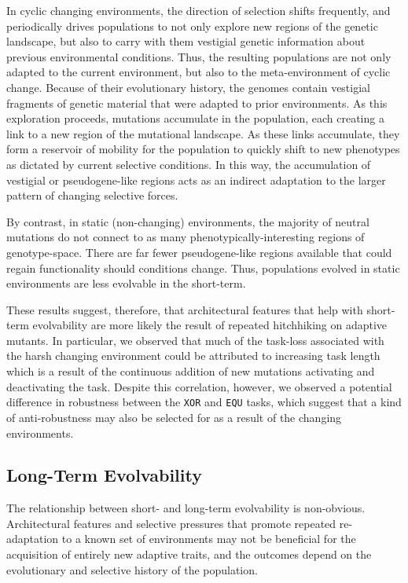 \documentclass[10pt,letterpaper,final]{article}
\begin{document}
In cyclic changing environments, the direction of selection shifts frequently, and periodically drives populations to not only explore new regions of the genetic landscape, but also to carry with them vestigial genetic information about previous environmental conditions. Thus, the resulting populations are not only adapted to the current environment, but also to the meta-environment of cyclic change. Because of their evolutionary history, the genomes contain vestigial fragments of genetic material that were adapted to prior environments. As this exploration proceeds, mutations accumulate in the population, each creating a link to a new region of the mutational landscape. As these links accumulate, they form a reservoir of mobility for the population to quickly shift to new phenotypes as dictated by current selective conditions. In this way, the accumulation of vestigial or pseudogene-like regions acts as an indirect adaptation to the larger pattern of changing selective forces. 

By contrast, in static (non-changing) environments, the majority of neutral mutations do not connect to as many phenotypically-interesting regions of genotype-space. There are far fewer pseudogene-like regions available that could regain functionality should conditions change. Thus, populations evolved in static environments are less evolvable in the short-term.

These results suggest, therefore, that architectural features that help with short-term evolvability are more likely the result of repeated hitchhiking on adaptive mutants. In particular, we observed that much of the task-loss associated with the harsh changing environment could be attributed to increasing task length which is a result of the continuous addition of new mutations activating and deactivating the task. Despite this correlation, however, we observed a potential difference in robustness between the \texttt{XOR} and \texttt{EQU} tasks, which suggest that a kind of anti-robustness may also be selected for as a result of the changing environments.

\subsection*{Long-Term Evolvability}
The relationship between short- and long-term evolvability is non-obvious. Architectural features and selective pressures that promote repeated re-adaptation to a known set of environments may not be beneficial for the acquisition of entirely new adaptive traits, and the outcomes depend on the evolutionary and selective history of the population. 
\end{document}
